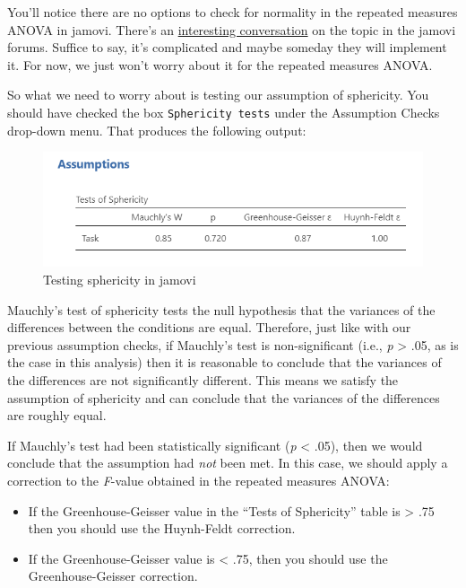 \documentclass[
]{book}
\providecommand{\tightlist}{%
  \setlength{\itemsep}{0pt}\setlength{\parskip}{0pt}}
\begin{document}
You'll notice there are no options to check for normality in the repeated measures ANOVA in jamovi. There's an \href{https://forum.jamovi.org/viewtopic.php?f=5\&t=1045}{interesting conversation} on the topic in the jamovi forums. Suffice to say, it's complicated and maybe someday they will implement it. For now, we just won't worry about it for the repeated measures ANOVA.

So what we need to worry about is testing our assumption of sphericity. You should have checked the box \texttt{Sphericity\ tests} under the Assumption Checks drop-down menu. That produces the following output:

\begin{figure}

{\centering \includegraphics[width=1\linewidth]{images/05-repeated-measures-anova/rm-anova_sphericity} 

}

\caption{Testing sphericity in jamovi}\label{fig:unnamed-chunk-3}
\end{figure}

Mauchly's test of sphericity tests the null hypothesis that the variances of the differences between the conditions are equal. Therefore, just like with our previous assumption checks, if Mauchly's test is non-significant (i.e., \emph{p} \textgreater{} .05, as is the case in this analysis) then it is reasonable to conclude that the variances of the differences are not significantly different. This means we satisfy the assumption of sphericity and can conclude that the variances of the differences are roughly equal.

If Mauchly's test had been statistically significant (\emph{p} \textless{} .05), then we would conclude that the assumption had \emph{not} been met. In this case, we should apply a correction to the \emph{F}-value obtained in the repeated measures ANOVA:

\begin{itemize}
\tightlist
\item
  If the Greenhouse-Geisser value in the ``Tests of Sphericity'' table is \textgreater{} .75 then you should use the Huynh-Feldt correction.
\item
  If the Greenhouse-Geisser value is \textless{} .75, then you should use the Greenhouse-Geisser correction.
\end{itemize}
\end{document}
